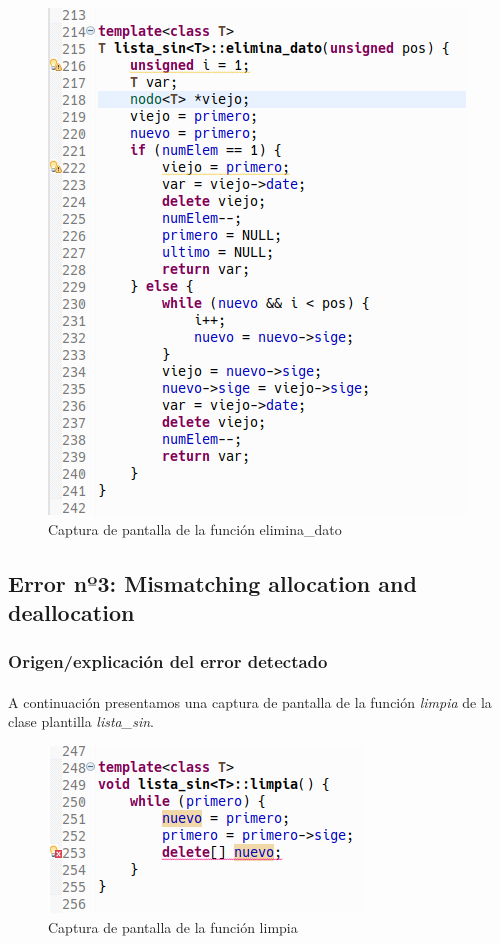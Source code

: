 			\begin{figure}[H]
				\centering
				\includegraphics[scale=0.7]{img/captura47.png}
				\caption{Captura de pantalla de la función elimina\_dato}
				\label{captura47}
			\end{figure}
		
	\subsection{Error nº3: Mismatching allocation and deallocation}

		\subsubsection{Origen/explicación del error detectado}
		
		\paragraph{}A continuación presentamos una captura de pantalla de la función \textit{limpia} de la clase plantilla \textit{lista\_sin}.
		
		\begin{figure}[H]
			\centering
			\includegraphics[scale=0.7]{img/captura48.png}
			\caption{Captura de pantalla de la función limpia}
			\label{captura48}
		\end{figure}
	
